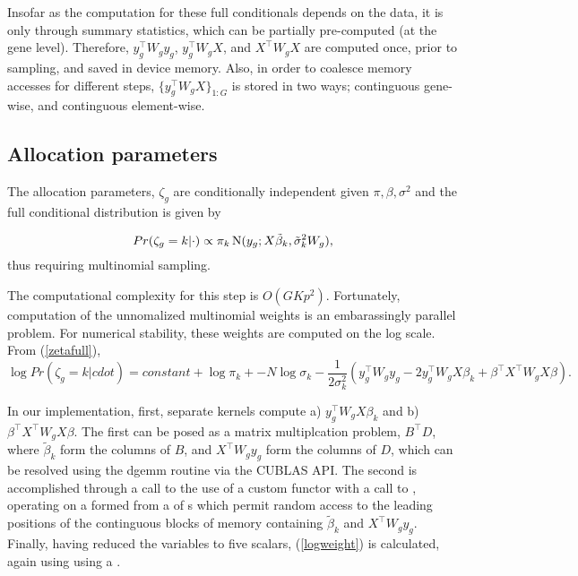 Insofar as the computation for these full conditionals depends on the data, it is only through summary statistics, which can be partially pre-computed (at the gene level). Therefore, $y_g^\top W_g y_g$, $y_g^\top W_g X$, and $X^\top W_g X$ are computed once, prior to sampling, and saved in device memory. Also, in order to coalesce memory accesses for different steps, $\{y_g^\top W_g X\}_{1:G}$ is stored in two ways; continguous gene-wise, and continguous
element-wise.

\subsection{Allocation parameters}
The allocation parameters, $\zeta_g$ are conditionally independent given $\pi, \beta, \sigma^2$ and the full conditional distribution is given by

\begin{equation}
\label{zetafull}
Pr(\zeta_g=k|\cdot) \propto \pi_k \operatorname{N}(y_g;X\tilde{\beta}_k,\tilde{\sigma}_k^2 W_g),
\end{equation}
thus requiring multinomial sampling.

The computational complexity for this step is $O(GKp^2)$. Fortunately, computation of the unnomalized multinomial weights is an embarassingly parallel problem. For numerical stability, these weights are computed on the log scale. From (\ref{zetafull}),
\begin{equation}
\label{logweight}
\log Pr(\zeta_g=k|cdot) = constant + \log \pi_k + -N \log \sigma_k - \frac{1}{2\sigma^2_k}\left(y_g^\top W_g y_g - 2y_g^\top W_g X \beta_k + \beta^\top X^\top W_g X \beta \right).
\end{equation}

In our implementation, first, separate kernels compute a) $y_g^\top W_g X \beta_k$ and b) $\beta^\top X^\top W_g X \beta$. The first can be posed as a matrix multiplcation problem, $B^\top D$, where $\tilde{\beta}_k$ form the columns of $B$, and $X^\top W_g y_g$ form the columns of $D$, which can be resolved using the dgemm routine via the CUBLAS API. The second is accomplished through a call to the use of a custom functor with a call to , operating on a  formed from a  of s which permit random access to the leading positions of the continguous blocks of memory containing $\tilde{\beta}_k$ and $X^\top W_g y_g$. Finally, having reduced the variables to five scalars, (\ref{logweight}) is calculated, again using  using a .

